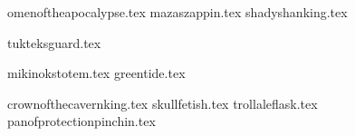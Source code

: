 
\raggedcolumns
\begin{multicols}{2}

	\subtitle{\weaponenchantments}	
	\startsortedpricelist
	
	{omenoftheapocalypse.tex}
	{mazaszappin.tex}
	{shadyshanking.tex}
	
	\endsortedpricelist

	\subtitle{\armourenchantments}
	\startsortedpricelist
	
	{tukteksguard.tex}

	\endsortedpricelist
	
	\subtitle{\bannerenchantments}
	\startsortedpricelist
	
	{mikinokstotem.tex}
	{greentide.tex}

	\endsortedpricelist

	\subtitle{\artefacts}
	\startsortedpricelist

	{crownofthecavernking.tex}
	{skullfetish.tex}
	{trollaleflask.tex}
	{panofprotectionpinchin.tex}

	\endsortedpricelist

\end{multicols}
